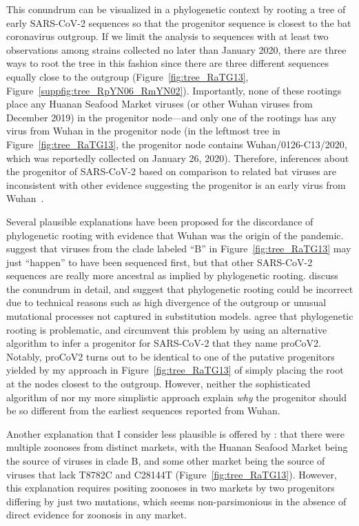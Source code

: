 \documentclass[9pt,twocolumn,twoside]{gsajnl_modified}
\begin{document}
This conundrum can be visualized in a phylogenetic context by rooting a tree of early SARS-CoV-2 sequences so that the progenitor sequence is closest to the bat coronavirus outgroup.
If we limit the analysis to sequences with at least two observations among strains collected no later than January 2020, there are three ways to root the tree in this fashion since there are three different sequences equally close to the outgroup (Figure~\ref{fig:tree_RaTG13}, Figure~\ref{suppfig:tree_RpYN06_RmYN02}).
Importantly, none of these rootings place any Huanan Seafood Market viruses (or other Wuhan viruses from December 2019) in the progenitor node---and only one of the rootings has any virus from Wuhan in the progenitor node (in the leftmost tree in Figure~\ref{fig:tree_RaTG13}, the progenitor node contains Wuhan/0126-C13/2020, which was reportedly collected on January 26, 2020).
Therefore, inferences about the progenitor of SARS-CoV-2 based on comparison to related bat viruses are inconsistent with other evidence suggesting the progenitor is an early virus from Wuhan~\citep{pipes2021assessing}.

Several plausible explanations have been proposed for the discordance of phylogenetic rooting with evidence that Wuhan was the origin of the pandemic.
\citet{rambaut2020dynamic} suggest that viruses from the clade labeled ``B'' in Figure~\ref{fig:tree_RaTG13} may just ``happen'' to have been sequenced first, but that other SARS-CoV-2 sequences are really more ancestral as implied by phylogenetic rooting.
\citet{pipes2021assessing} discuss the conundrum in detail, and suggest that phylogenetic rooting could be incorrect due to technical reasons such as high divergence of the outgroup or unusual mutational processes not captured in substitution models.
\citet{kumar2021evolutionary} agree that phylogenetic rooting is problematic, and circumvent this problem by using an alternative algorithm to infer a progenitor for SARS-CoV-2 that they name proCoV2.
Notably, proCoV2 turns out to be identical to one of the putative progenitors yielded by my approach in Figure~\ref{fig:tree_RaTG13} of simply placing the root at the nodes closest to the outgroup.
However, neither the sophisticated algorithm of \citet{kumar2021evolutionary} nor my more simplistic approach explain \emph{why} the progenitor should be so different from the earliest sequences reported from Wuhan.

Another explanation that I consider less plausible is offered by \citet{garry2021early}: that there were multiple zoonoses from distinct markets, with the Huanan Seafood Market being the source of viruses in clade B, and some other market being the source of viruses that lack T8782C and C28144T (Figure~\ref{fig:tree_RaTG13}).
However, this explanation requires positing zoonoses in two markets by two progenitors differing by just two mutations, which seems non-parsimonious in the absence of direct evidence for zoonosis in any market.
\end{document}
